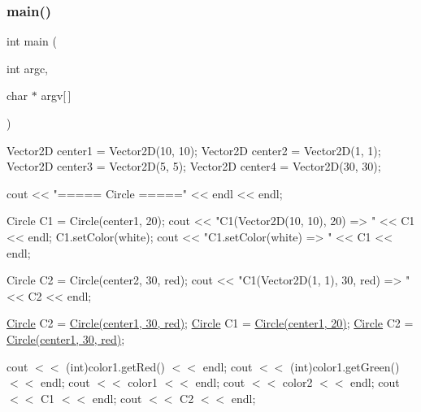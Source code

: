 \subsubsection{\texorpdfstring{main()}{main()}}
{\footnotesize\ttfamily int main (\begin{DoxyParamCaption}\item[{int}]{argc,  }\item[{char $\ast$}]{argv\mbox{[}$\,$\mbox{]} }\end{DoxyParamCaption})}

\begin{DoxyVerb}Vector2D center1 = Vector2D(10, 10);
Vector2D center2 = Vector2D(1, 1);
Vector2D center3 = Vector2D(5, 5);
Vector2D center4 = Vector2D(30, 30);

cout << "===== Circle =====" << endl << endl;

Circle C1 = Circle(center1, 20);
cout << "C1(Vector2D(10, 10), 20) => " << C1 << endl;
C1.setColor(white);
cout << "C1.setColor(white) => " << C1 << endl;

Circle C2 = Circle(center2, 30, red);
cout << "C1(Vector2D(1, 1), 30, red) => " << C2 << endl;
\end{DoxyVerb}


\hyperlink{class_circle}{Circle} C2 = \hyperlink{class_circle}{Circle(center1, 30, red)}; \hyperlink{class_circle}{Circle} C1 = \hyperlink{class_circle}{Circle(center1, 20)}; \hyperlink{class_circle}{Circle} C2 = \hyperlink{class_circle}{Circle(center1, 30, red)};

cout $<$$<$ (int)color1.\+get\+Red() $<$$<$ endl; cout $<$$<$ (int)color1.\+get\+Green() $<$$<$ endl; cout $<$$<$ color1 $<$$<$ endl; cout $<$$<$ color2 $<$$<$ endl; cout $<$$<$ C1 $<$$<$ endl; cout $<$$<$ C2 $<$$<$ endl;